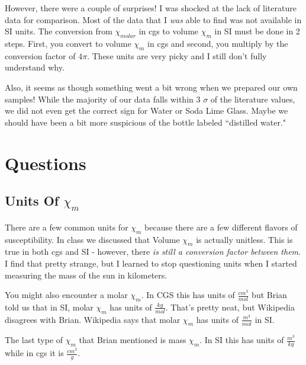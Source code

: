 \documentclass{article}
\begin{document}
However, there were a couple of surprises! I was shocked at the lack
of literature data for comparison. Most of the data that I \textit{was} able to
find was not available in SI units. The conversion from $\chi_{molar}$ in cgs
to volume $\chi_m$ in SI must be done in 2 steps. First, you convert to volume
$\chi_m$ in cgs and second, you multiply by the conversion factor of $4 \pi$.
These units are very picky and I still don't fully understand why.

Also, it seems as though something went a bit wrong when we prepared our own
samples! While the majority of our data falls within 3 $\sigma$ of the
literature values, we did not even get the correct sign for Water or Soda Lime
Glass. Maybe we should have been a bit more suspicious of the bottle labeled
``distilled water."



\section{Questions}
\subsection{Units Of $\chi_m$}

There are a few common units for $\chi_m$ because there are a few different
flavors of susceptibility. In class we discussed that Volume $\chi_m$ is
actually unitless. This is true in both cgs and SI - however, there \textit{is
    still a conversion factor between them}. I find that pretty strange, but I
learned to stop questioning units when I started measuring the mass of the sun
in kilometers.

You might also encounter a molar $\chi_m$. In CGS this has units of
$\frac{cm^3}{mol}$ but Brian told us that in SI, molar $\chi_m$ has units of
$\frac{kg}{mol}$. That's pretty neat, but Wikipedia disagrees with Brian.
Wikipedia says that molar $\chi_m$ has units of $\frac{m^3}{mol}$ in SI.

The last type of $\chi_m$ that Brian mentioned is mass $\chi_m$. In SI this has
units of $\frac{m^3}{kg}$ while in cgs it is $\frac{cm^3}{g}$.
\end{document}
